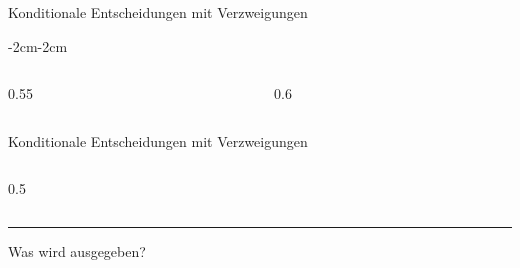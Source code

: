 \begin{frame}[fragile]{Konditionale Entscheidungen mit Verzweigungen}
    \begin{adjustwidth}{-2cm}{-2cm}
        \begin{columns}
            \begin{column}{0.55\textwidth}
                
            \end{column}
            \begin{column}{0.6\textwidth}
            \end{column}
        \end{columns}
    \end{adjustwidth}
\end{frame}

\begin{frame}[fragile]{Konditionale Entscheidungen mit Verzweigungen}
    \begin{columns}
        \begin{column}{0.5\textwidth}
            
        \end{column}
    \end{columns}


    \vspace{0.5cm}
    \rule{\textwidth}{.5pt}
    \begin{center}
        Was wird ausgegeben?
    \end{center}
\end{frame}

